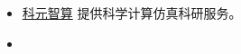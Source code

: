 
\begin{itemize}
\item \href{https://www.keyuanzhisuan.com/}{科元智算} 提供科学计算仿真科研服务。
\item 
\end{itemize}

